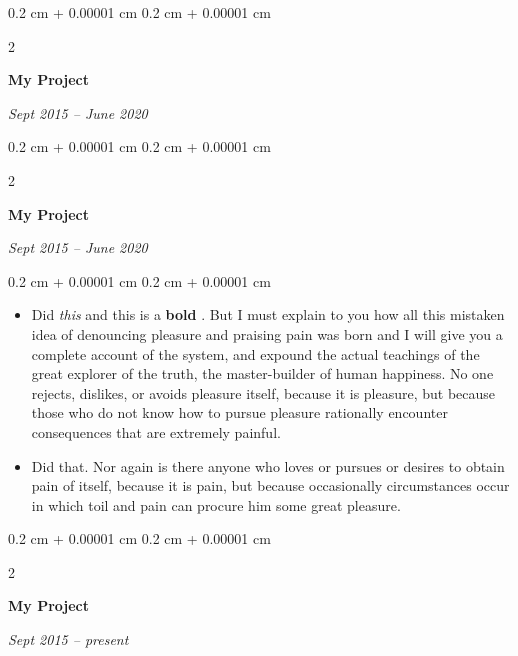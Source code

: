 \documentclass[10pt, letterpaper]{article}
\newenvironment{highlights}{
    \begin{itemize}[
        topsep=0.10 cm,
        parsep=0.10 cm,
        partopsep=0pt,
        itemsep=0pt,
        leftmargin=0.4 cm + 10pt
    ]
}{
    \end{itemize}
} %
\newenvironment{onecolentry}{
    \begin{adjustwidth}{
        0.2 cm + 0.00001 cm
    }{
        0.2 cm + 0.00001 cm
    }
}{
    \end{adjustwidth}
} %
\newenvironment{twocolentry}[2][]{
    \onecolentry
    \def\secondColumn{#2}
    \setcolumnwidth{\fill, 4.5 cm}
    \begin{paracol}{2}
}{
    \switchcolumn \raggedleft \secondColumn
    \end{paracol}
    \endonecolentry
} %
\let\hrefWithoutArrow\href
\renewcommand{\href}[2]{\hrefWithoutArrow{#1}{\ifthenelse{\equal{#2}{}}{ }{#2 }\raisebox{.15ex}{\footnotesize \faExternalLink*}}}
\begin{document}
        \vspace{0.2 cm}

        \begin{twocolentry}{
            
            
        \textit{Sept 2015 – June 2020}}
            \textbf{My Project}
        \end{twocolentry}



        \vspace{0.2 cm}

        \begin{twocolentry}{
            
            
        \textit{Sept 2015 – June 2020}}
            \textbf{My Project}
        \end{twocolentry}

        \vspace{0.10 cm}
        \begin{onecolentry}
            \begin{highlights}
                \item Did \textit{this} and this is a \textbf{bold} \href{https://example.com}{link}. But I must explain to you how all this mistaken idea of denouncing pleasure and praising pain was born and I will give you a complete account of the system, and expound the actual teachings of the great explorer of the truth, the master-builder of human happiness. No one rejects, dislikes, or avoids pleasure itself, because it is pleasure, but because those who do not know how to pursue pleasure rationally encounter consequences that are extremely painful.
                \item Did that. Nor again is there anyone who loves or pursues or desires to obtain pain of itself, because it is pain, but because occasionally circumstances occur in which toil and pain can procure him some great pleasure.
            \end{highlights}
        \end{onecolentry}


        \vspace{0.2 cm}

        \begin{twocolentry}{
            
            
        \textit{Sept 2015 – present}}
            \textbf{My Project}
        \end{twocolentry}
\end{document}
